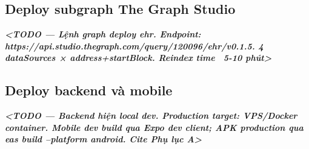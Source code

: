 \documentclass[../DoAn]{subfiles}
\begin{document}
\subsection{Deploy subgraph The Graph Studio}
\textit{\textbf{<TODO — Lệnh graph deploy ehr. Endpoint: https://api.studio.thegraph.com/query/120096/ehr/v0.1.5. 4 dataSources × address+startBlock. Reindex time ~5-10 phút>}}

\subsection{Deploy backend và mobile}
\textit{\textbf{<TODO — Backend hiện local dev. Production target: VPS/Docker container. Mobile dev build qua Expo dev client; APK production qua eas build --platform android. Cite Phụ lục A>}}
\end{document}
